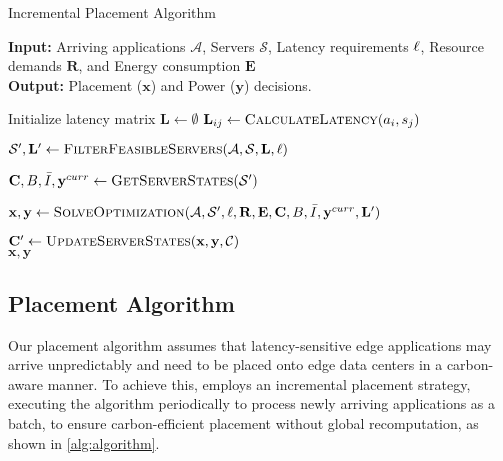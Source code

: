 \begin{algorithm}[t]
\scriptsize
\caption{\proposedsystem Incremental Placement Algorithm}
\label{alg:algorithm}
\raggedright
\textbf{Input:} Arriving applications $\mathcal{A}$,  Servers $\mathcal{S}$, Latency requirements $\boldmath{\ell}$, Resource demands $\mathbf{R}$, and Energy consumption $\mathbf{E}$ \\
\textbf{Output:} Placement ($\mathbf{x}$) and Power ($\mathbf{y}$) decisions.
\begin{algorithmic}[1]
\State Initialize latency matrix $\mathbf{L} \gets \emptyset$
\State $\mathbf{L}_{ij} \gets \textsc{CalculateLatency}(a_i, s_j)$ \label{ln:latency_calc} 
\EndFor
\EndFor

\State $\mathcal{S}', \mathbf{L}' \gets \textsc{FilterFeasibleServers}(\mathcal{A}, \mathcal{S}, \mathbf{L}, \boldmath{\ell})$ \label{ln:preprocess} 

\State $\mathbf{C}, B, \bar{I}, \mathbf{y}^{curr} \gets \textsc{GetServerStates}(\mathcal{S}')$ 

\State $\mathbf{x}, \mathbf{y} \gets \textsc{SolveOptimization}(\mathcal{A}, \mathcal{S}', \boldmath{\ell}, \mathbf{R}, \mathbf{E}, \mathbf{C}, B, \bar{I} , \mathbf{y}^{curr}, \mathbf{L}')$ \label{ln:solve}

\State $\mathbf{C}' \gets \textsc{UpdateServerStates}(\mathbf{x}, \mathbf{y}, \mathcal{C})$ \label{ln:update}
  \\

\Return $\mathbf{x}, \mathbf{y}$
\end{algorithmic}
\end{algorithm}


\subsection{\proposedsystem Placement Algorithm}\label{sec:design_algorithm}
Our placement algorithm assumes that latency-sensitive edge applications may arrive unpredictably and need to be placed onto edge data centers in a carbon-aware manner. To achieve this, \proposedsystem employs an incremental placement strategy, executing the algorithm periodically to process newly arriving applications as a batch, to ensure carbon-efficient placement without global recomputation, as shown in \autoref{alg:algorithm}.


